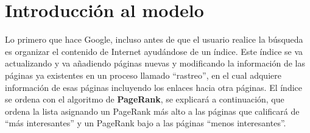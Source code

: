 \documentclass[size=a4, parskip=half, titlepage=false, toc=flat, toc=bib, 12pt]{scrartcl}
\theoremstyle{theorem-style}
\theoremstyle{definition-style}
\theoremstyle{remark-style}
\theoremstyle{example-style}
\theoremstyle{definition-style}
\theoremstyle{remark-style}
\begin{document}
\section{Introducción al modelo}
Lo primero que hace Google, incluso antes de que el usuario realice la búsqueda es organizar el contenido de Internet ayudándose de un índice. Este índice se va actualizando y va añadiendo páginas nuevas y modificando la información de las páginas ya existentes en un proceso llamado ``rastreo'', en el cual adquiere información de esas páginas incluyendo los enlaces hacia otra páginas. El índice se ordena con el algoritmo de \textbf{PageRank}, se explicará a continuación, que ordena la lista asignando un PageRank más alto a las páginas que calificará de ``más interesantes'' y un PageRank bajo a las páginas ``menos interesantes''.
\end{document}
